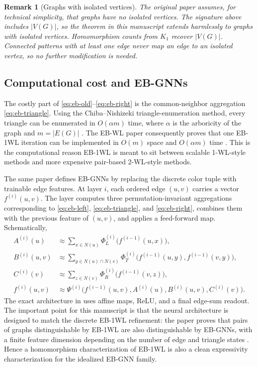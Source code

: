 \documentclass[11pt]{article}
\newtheorem{remark}[theorem]{Remark}
\begin{document}
\begin{remark}[Graphs with isolated vertices]
The original paper assumes, for technical simplicity, that graphs have no isolated vertices.  The signature above includes $|V(G)|$, so the theorem in this manuscript extends harmlessly to graphs with isolated vertices.  Homomorphism counts from $K_1$ recover $|V(G)|$.  Connected patterns with at least one edge never map an edge to an isolated vertex, so no further modification is needed.
\end{remark}

\subsection{Computational cost and EB-GNNs}

The costly part of \eqref{eq:eb-old}--\eqref{eq:eb-right} is the common-neighbor aggregation \eqref{eq:eb-triangle}.  Using the Chiba--Nishizeki triangle-enumeration method, every triangle can be enumerated in $O(\alpha m)$ time, where $\alpha$ is the arboricity of the graph and $m=|E(G)|$ \cite{ChibaNishizeki1985}.  The EB-WL paper consequently proves that one EB-1WL iteration can be implemented in $O(m)$ space and $O(\alpha m)$ time \cite{EBWL}.  This is the computational reason EB-1WL is meant to sit between scalable 1-WL-style methods and more expensive pair-based 2-WL-style methods.

The same paper defines EB-GNNs by replacing the discrete color tuple with trainable edge features.  At layer $i$, each ordered edge $(u,v)$ carries a vector $f^{(i)}(u,v)$.  The layer computes three permutation-invariant aggregations corresponding to \eqref{eq:eb-left}, \eqref{eq:eb-triangle}, and \eqref{eq:eb-right}, combines them with the previous feature of $(u,v)$, and applies a feed-forward map.  Schematically,
\begin{align*}
A^{(i)}(u)      &\approx \sum_{x\in N(u)} \Phi_L^{(i)}\bigl(f^{(i-1)}(u,x)\bigr),\\
B^{(i)}(u,v)    &\approx \sum_{y\in N(u)\cap N(v)} \Phi_T^{(i)}\bigl(f^{(i-1)}(u,y),f^{(i-1)}(v,y)\bigr),\\
C^{(i)}(v)      &\approx \sum_{z\in N(v)} \Phi_R^{(i)}\bigl(f^{(i-1)}(v,z)\bigr),\\
 f^{(i)}(u,v)   &\approx \Psi^{(i)}\bigl(f^{(i-1)}(u,v),A^{(i)}(u),B^{(i)}(u,v),C^{(i)}(v)\bigr).
\end{align*}
The exact architecture in \cite{EBWL} uses affine maps, ReLU, and a final edge-sum readout.  The important point for this manuscript is that the neural architecture is designed to match the discrete EB-1WL refinement: the paper proves that pairs of graphs distinguishable by EB-1WL are also distinguishable by EB-GNNs, with a finite feature dimension depending on the number of edge and triangle states \cite{EBWL}.  Hence a homomorphism characterization of EB-1WL is also a clean expressivity characterization for the idealized EB-GNN family.
\end{document}
